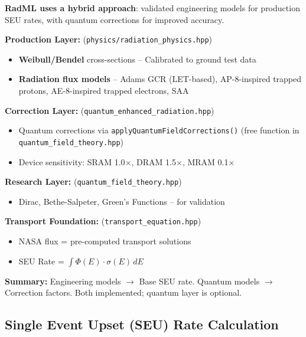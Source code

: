 \documentclass[11pt,a4paper]{article}
\begin{document}
\begin{tcolorbox}[colback=blue!5!white,colframe=blue!75!black,title=Physics Model Integration,breakable]
\textbf{RadML uses a hybrid approach}: validated engineering models for production SEU rates, with quantum corrections for improved accuracy.

\vspace{0.3em}
\textbf{Production Layer:} (\texttt{physics/radiation\_physics.hpp})
\begin{itemize}[noitemsep,topsep=0pt]
    \item \textbf{Weibull/Bendel} cross-sections -- Calibrated to ground test data
    \item \textbf{Radiation flux models} -- Adams GCR (LET-based), AP-8-inspired trapped protons, AE-8-inspired trapped electrons, SAA
\end{itemize}

\textbf{Correction Layer:} (\texttt{quantum\_enhanced\_radiation.hpp})
\begin{itemize}[noitemsep,topsep=0pt]
    \item Quantum corrections via \texttt{applyQuantumFieldCorrections()} (free function in \texttt{quantum\_field\_theory.hpp})
    \item Device sensitivity: SRAM 1.0$\times$, DRAM 1.5$\times$, MRAM 0.1$\times$
\end{itemize}

\textbf{Research Layer:} (\texttt{quantum\_field\_theory.hpp})
\begin{itemize}[noitemsep,topsep=0pt]
    \item Dirac, Bethe-Salpeter, Green's Functions -- for validation
\end{itemize}

\textbf{Transport Foundation:} (\texttt{transport\_equation.hpp})
\begin{itemize}[noitemsep,topsep=0pt]
    \item NASA flux = pre-computed transport solutions
    \item SEU Rate = $\int \Phi(E) \cdot \sigma(E) \, dE$
\end{itemize}

\textbf{Summary:} Engineering models $\to$ Base SEU rate. Quantum models $\to$ Correction factors. Both implemented; quantum layer is optional.
\end{tcolorbox}

\subsection{Single Event Upset (SEU) Rate Calculation}
\end{document}
